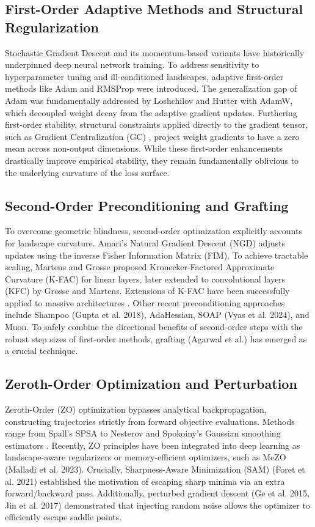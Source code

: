 \documentclass[conference]{IEEEtran}
\begin{document}
\subsection{First-Order Adaptive Methods and Structural Regularization}
Stochastic Gradient Descent and its momentum-based variants have historically underpinned deep neural network training. To address sensitivity to hyperparameter tuning and ill-conditioned landscapes, adaptive first-order methods like Adam \cite{kingma2014adam} and RMSProp were introduced. The generalization gap of Adam was fundamentally addressed by Loshchilov and Hutter \cite{loshchilov2019decoupled} with AdamW, which decoupled weight decay from the adaptive gradient updates. Furthering first-order stability, structural constraints applied directly to the gradient tensor, such as Gradient Centralization (GC) \cite{yong2020gradient}, project weight gradients to have a zero mean across non-output dimensions. While these first-order enhancements drastically improve empirical stability, they remain fundamentally oblivious to the underlying curvature of the loss surface.

\subsection{Second-Order Preconditioning and Grafting}
To overcome geometric blindness, second-order optimization explicitly accounts for landscape curvature. Amari's Natural Gradient Descent (NGD) \cite{amari1998natural} adjusts updates using the inverse Fisher Information Matrix (FIM). To achieve tractable scaling, Martens and Grosse \cite{martens2015optimizing} proposed Kronecker-Factored Approximate Curvature (K-FAC) for linear layers, later extended to convolutional layers (KFC) by Grosse and Martens. Extensions of K-FAC have been successfully applied to massive architectures \cite{osawa2019large}. Other recent preconditioning approaches include Shampoo (Gupta et al. 2018), AdaHessian, SOAP (Vyas et al. 2024), and Muon. To safely combine the directional benefits of second-order steps with the robust step sizes of first-order methods, grafting (Agarwal et al.) has emerged as a crucial technique.

\subsection{Zeroth-Order Optimization and Perturbation}
Zeroth-Order (ZO) optimization bypasses analytical backpropagation, constructing trajectories strictly from forward objective evaluations. Methods range from Spall's SPSA \cite{spall1992multivariate} to Nesterov and Spokoiny's Gaussian smoothing estimators \cite{nesterov2017random}. Recently, ZO principles have been integrated into deep learning as landscape-aware regularizers or memory-efficient optimizers, such as MeZO (Malladi et al. 2023). Crucially, Sharpness-Aware Minimization (SAM) (Foret et al. 2021) established the motivation of escaping sharp minima via an extra forward/backward pass. Additionally, perturbed gradient descent (Ge et al. 2015, Jin et al. 2017) demonstrated that injecting random noise allows the optimizer to efficiently escape saddle points.
\end{document}
